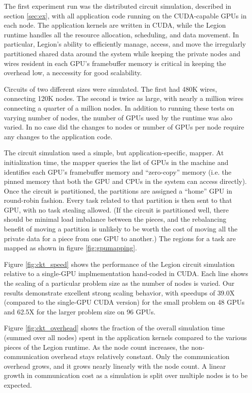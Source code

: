 The first experiment run was the distributed circuit simulation, described in 
section \ref{sec:ex}, with all application code running on the CUDA-capable GPUs in
each node.  The application kernels are written in CUDA, while the Legion runtime
handles all the resource allocation, scheduling, and data movement.  In particular,
Legion's ability to efficiently manage, access, and move the irregularly partitioned
shared data around the system while keeping the private nodes and wires resident in
each GPU's framebuffer memory is critical in keeping the overhead low, a neccessity
for good scalability.

Circuits of two different sizes were simulated.  The first had 480K wires, connecting
120K nodes.  The second is twice as large, with nearly a million wires connecting a
quarter of a million nodes.  In addition to running these tests on varying number of
nodes, the number of GPUs used by the runtime was also varied.  In no case did the 
changes to nodes or number of GPUs per node require any changes to the application code.

The circuit simulation used a simple, but application-specific, mapper.  At initialization
time, the mapper queries the list of GPUs in the machine and identifies each GPU's
framebuffer memory and ``zero-copy'' memory (i.e. the pinned memory that both the GPU and
CPUs in the system can access directly).  Once the circuit is partitioned, the partitions
are assigned a ``home'' GPU in round-robin fashion.  Every task related to that partition is
then sent to that GPU, with no task stealing allowed.  (If the circuit is partitioned well,
there should be minimal load imbalance between the pieces, and the rebalancing benefit of 
moving a partition is unlikely to be worth the cost of moving all the 
private data for a piece from one GPU to another.)  The regions for a task are mapped as 
shown in figure \ref{fig:gpumapping}.

Figure \ref{fig:ckt_speed} shows the performance of the Legion circuit simulation relative
to a single-GPU implmementation hand-coded in CUDA.  Each line shows the scaling of
a particular problem size as the number of nodes is varied.  Our results demonstrate
excellent strong scaling behavior, with speedups of 39.0X (compared to the single-GPU CUDA
version) for the small problem on 48 GPUs and 62.5X for the larger problem size on 96 GPUs.

Figure \ref{fig:ckt_overhead} shows the fraction of the overall simulation time (summed over
all nodes) spent in the application kernels compared to the various pieces of the Legion
runtime.  As the node count increases, the non-communication overhead stays relatively constant.
Only the communication overhead grows, and it grows nearly linearly with the node count.
A linear growth in communication cost as a simulation is split over multiple nodes is to
be expected.

